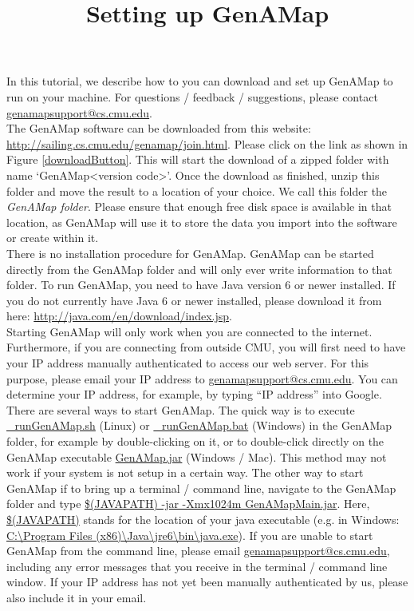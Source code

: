 \documentclass{article}
\title{Setting up GenAMap}
\author{}
\date{}
\begin{document}
\maketitle


In this tutorial, we describe how to you can download and set up GenAMap to run on your machine. For questions / feedback / suggestions, please contact \url{genamapsupport@cs.cmu.edu}.\\

The GenAMap software can be downloaded from this website: \url{http://sailing.cs.cmu.edu/genamap/join.html}. Please click on the link as shown in Figure \ref{downloadButton}. This will start the download of a zipped folder with name `GenAMap\textless version code\textgreater'. Once the download as finished, unzip this folder and move the result to a location of your choice. We call this folder the {\it GenAMap folder}. Please ensure that enough free disk space is available in that location, as GenAMap will use it to store the data you import into the software or create within it.\\

There is no installation procedure for GenAMap. GenAMap can be started directly from the GenAMap folder and will only ever write information to that folder. To run GenAMap, you need to have Java version 6 or newer installed. If you do not currently have Java 6 or newer installed, please download it from here: \url{http://java.com/en/download/index.jsp}.\\

Starting GenAMap will only work when you are connected to the internet. Furthermore, if you are connecting from outside CMU, you will first need to have your IP address manually authenticated to access our web server. For this purpose, please email your IP address to \url{genamapsupport@cs.cmu.edu}. You can determine your IP address, for example, by typing ``IP address'' into Google.\\

There are several ways to start GenAMap. The quick way is to execute \url{_runGenAMap.sh} (Linux) or \url{_runGenAMap.bat} (Windows) in the GenAMap folder, for example by double-clicking on it, or to double-click directly on the GenAMap executable \url{GenAMap.jar} (Windows / Mac). This method may not work if your system is not setup in a certain way. The other way to start GenAMap if to bring up a terminal / command line, navigate to the GenAMap folder and type \url{$(JAVAPATH) -jar -Xmx1024m GenAMapMain.jar}. Here, \url{$(JAVAPATH)} stands for the location of your java executable (e.g. in Windows: \url{C:\Program Files (x86)\Java\jre6\bin\java.exe}). If you are unable to start GenAMap from the command line, please email \url{genamapsupport@cs.cmu.edu}, including any error messages that you receive in the terminal / command line window. If your IP address has not yet been manually authenticated by us, please also include it in your email.\\
\end{document}
